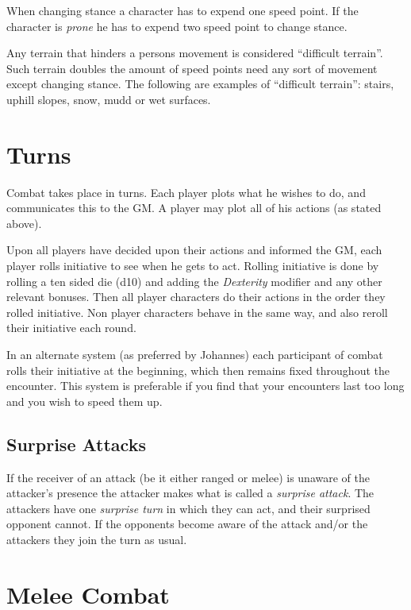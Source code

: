 When changing stance a character has to expend one speed point. If the character
is \emph{prone} he has to expend two speed point to change stance.

Any terrain that hinders a persons movement is considered ``difficult terrain''.
Such terrain doubles the amount of speed points need any sort of movement except
changing stance. The following are examples of ``difficult terrain'': stairs,
uphill slopes, snow, mudd or wet surfaces.

\section{Turns}
\label{sec:7-Turns}

Combat takes place in turns. Each player plots what he wishes to do, and
communicates this to the GM. A player may plot all of his actions (as stated
above).

Upon all players have decided upon their actions and informed the GM, each
player rolls initiative to see when he gets to act. Rolling initiative is done
by rolling a ten sided die (d10) and adding the \emph{Dexterity} modifier and
any other relevant bonuses. Then all player characters do their actions in the
order they rolled initiative. Non player characters behave in the same way,
and also reroll their initiative each round.

In an alternate system (as preferred by Johannes) each participant of combat
rolls their initiative at the beginning, which then remains fixed throughout the
encounter. This system is preferable if you find that your encounters last too
long and you wish to speed them up.

\subsection{Surprise Attacks}
\label{sub:7-Surprise Attacks}

If the receiver of an attack (be it either ranged or melee) is unaware of the
attacker's presence the attacker makes what is called a \emph{surprise attack}.
The attackers have one \emph{surprise turn} in which they can act, and their
surprised opponent cannot. If the opponents become aware of the attack and/or
the attackers they join the turn as usual.

\section{Melee Combat}
\label{sec:7-Melee Combat}

